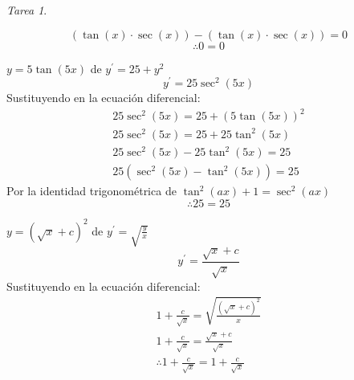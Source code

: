\documentclass[12pt]{article} %
\theoremstyle{remark} %
\newtheorem{tarea}{Tarea}[section] %
\newcounter{ejercicio}[tarea]
\newcommand{\ed}{ecuación diferencial}
\begin{document}
\begin{tarea}
\begin{ejercicio}[7]
    \[ (\tan(x) \cdot \sec(x)) - (\tan(x) \cdot \sec(x)) = 0\]
    \[ \therefore 0 = 0 \]
  \end{ejercicio}
  \begin{ejercicio}[9]
    $y = 5 \tan(5x)$ de $y^{\prime} = 25 + y^2$
    \[ y^{\prime} = 25 \sec^2(5x) \]
    Sustituyendo en la \ed :
    \begin{gather*}
      25 \sec^2(5x) = 25 + (5 \tan(5x))^2\\[0.5em]
      25 \sec^2(5x) = 25 + 25 \tan^2(5x)\\[0.5em]
      25 \sec^2(5x) - 25 \tan^2(5x) = 25\\[0.5em]
      25(\sec^2(5x) - \tan^2(5x)) = 25
    \end{gather*}
    Por la identidad trigonométrica de $\tan^2(ax) + 1 = \sec^2(ax)$
    \[ \therefore 25 = 25 \]
  \end{ejercicio}
  \begin{ejercicio}[10]
    $y = (\sqrt{x} + c)^2$ de $y^{\prime} = \sqrt{\frac{y}{x}}$
    \[ y^{\prime} = \frac{\sqrt{x} + c}{\sqrt{x}} \]
    Sustituyendo en la \ed :
    \begin{gather*}
      1 + \frac{c}{\sqrt{x}} = \sqrt{\frac{(\sqrt{x}+c)^2}{x}}\\[0.5em]
      1 + \frac{c}{\sqrt{x}} = \frac{\sqrt{x} + c}{\sqrt{x}}\\[0.5em]
      \therefore 1 + \frac{c}{\sqrt{x}} = 1 + \frac{c}{\sqrt{x}}
    \end{gather*}
  \end{ejercicio}
\end{tarea}
\end{document}
